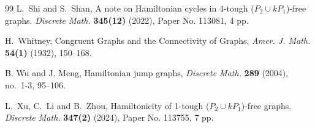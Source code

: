 \documentclass[12pt]{article}
\theoremstyle{definition}
\begin{document}
\begin{thebibliography}{99}
L.~Shi and S.~Shan,
A note on Hamiltonian cycles in 4-tough ($P_2\cup kP_1$)-free graphs.
{\em Discrete Math.} {\bf 345(12)} (2022), Paper No. 113081, 4 pp.

H.~Whitney, 
Congruent Graphs and the Connectivity of Graphs, 
\emph{Amer. J. Math.} {\bf 54(1)} (1932), 150--168.

B. Wu and J. Meng, Hamiltonian jump graphs, 
{\em Discrete Math.} {\bf 289} (2004), no.~1-3, 95--106.

L.~Xu, C.~Li and B.~Zhou,
Hamiltonicity of 1-tough ($P_2 \cup kP_1$)-free graphs.
{\em Discrete Math.} {\bf 347(2)} (2024), Paper No. 113755, 7 pp.

\end{thebibliography}
\end{document}
